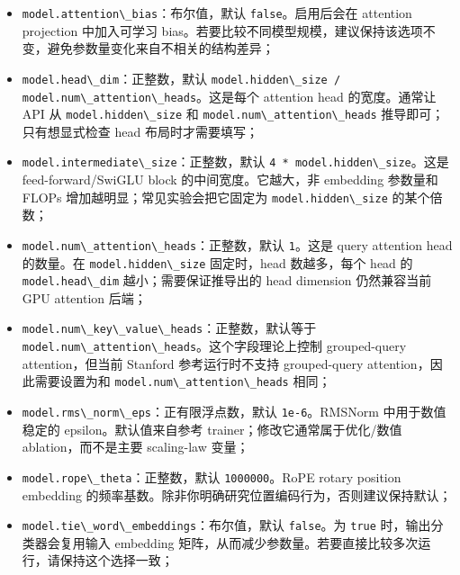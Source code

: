 \documentclass[
]{ctexart}
\newcommand{\passthrough}[1]{#1}
\providecommand{\tightlist}{%
  \setlength{\itemsep}{0pt}\setlength{\parskip}{0pt}}
\begin{document}
\begin{itemize}
\tightlist
\item
  \passthrough{\lstinline!model.attention\_bias!}：布尔值，默认
  \passthrough{\lstinline!false!}。启用后会在 attention projection
  中加入可学习
  bias。若要比较不同模型规模，建议保持该选项不变，避免参数量变化来自不相关的结构差异；
\item
  \passthrough{\lstinline!model.head\_dim!}：正整数，默认
  \passthrough{\lstinline!model.hidden\_size / model.num\_attention\_heads!}。这是每个
  attention head 的宽度。通常让 API 从
  \passthrough{\lstinline!model.hidden\_size!} 和
  \passthrough{\lstinline!model.num\_attention\_heads!}
  推导即可；只有想显式检查 head 布局时才需要填写；
\item
  \passthrough{\lstinline!model.intermediate\_size!}：正整数，默认
  \passthrough{\lstinline!4 * model.hidden\_size!}。这是
  feed-forward/SwiGLU block 的中间宽度。它越大，非 embedding 参数量和
  FLOPs 增加越明显；常见实验会把它固定为
  \passthrough{\lstinline!model.hidden\_size!} 的某个倍数；
\item
  \passthrough{\lstinline!model.num\_attention\_heads!}：正整数，默认
  \passthrough{\lstinline!1!}。这是 query attention head 的数量。在
  \passthrough{\lstinline!model.hidden\_size!} 固定时，head 数越多，每个
  head 的 \passthrough{\lstinline!model.head\_dim!}
  越小；需要保证推导出的 head dimension 仍然兼容当前 GPU attention
  后端；
\item
  \passthrough{\lstinline!model.num\_key\_value\_heads!}：正整数，默认等于
  \passthrough{\lstinline!model.num\_attention\_heads!}。这个字段理论上控制
  grouped-query attention，但当前 Stanford 参考运行时不支持
  grouped-query attention，因此需要设置为和
  \passthrough{\lstinline!model.num\_attention\_heads!} 相同；
\item
  \passthrough{\lstinline!model.rms\_norm\_eps!}：正有限浮点数，默认
  \passthrough{\lstinline!1e-6!}。RMSNorm 中用于数值稳定的
  epsilon。默认值来自参考 trainer；修改它通常属于优化/数值
  ablation，而不是主要 scaling-law 变量；
\item
  \passthrough{\lstinline!model.rope\_theta!}：正整数，默认
  \passthrough{\lstinline!1000000!}。RoPE rotary position embedding
  的频率基数。除非你明确研究位置编码行为，否则建议保持默认；
\item
  \passthrough{\lstinline!model.tie\_word\_embeddings!}：布尔值，默认
  \passthrough{\lstinline!false!}。为 \passthrough{\lstinline!true!}
  时，输出分类器会复用输入 embedding
  矩阵，从而减少参数量。若要直接比较多次运行，请保持这个选择一致；

\end{itemize}
\end{document}
